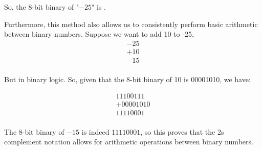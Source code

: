 \documentclass{article}
\begin{document}
\begin{center}
    So, the 8-bit binary of "$-25$" is .
\end{center}

\noindent Furthermore, this method also allows us to consistently perform basic arithmetic between binary numbers. Suppose we want to add 10 to -25,
\[
    \begin{array}{r}
        -25 \\
    +  10 \\
    \hline
        -15 \\
    \end{array}
\]

\begin{center}
    But in binary logic. So, given that the 8-bit binary of 10 is 00001010, we have:
\end{center}
\[
    \begin{array}{r}
        11100111 \\
    +  00001010 \\
    \hline
        11110001 \\
    \end{array}
\]
\begin{center}
    The 8-bit binary of $-15$ is indeed $11110001$, so this proves that the 2s complement notation allows for arithmetic operations between binary numbers.
\end{center}
\end{document}
